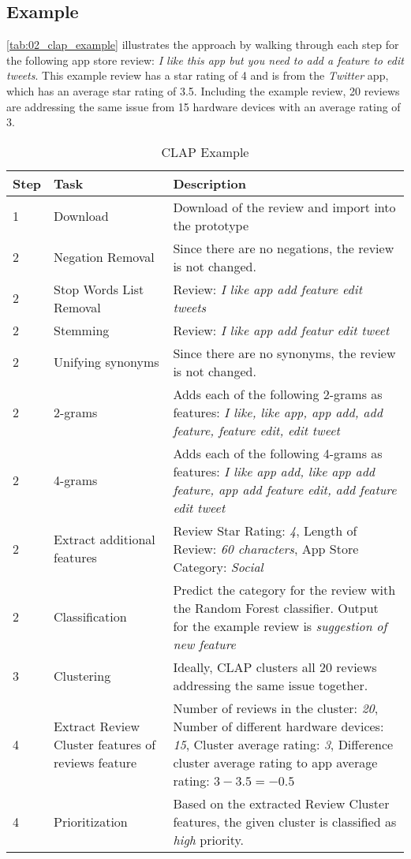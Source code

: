 \subsection{Example}

\autoref{tab:02_clap_example} illustrates the approach by walking through each step for the following app store review: \textit{I like this app but you need to add a feature to edit tweets}. This example review has a star rating of 4 and is from the \textit{Twitter} app, which has an average star rating of 3.5. Including the example review, 20 reviews are addressing the same issue from 15 hardware devices with an average rating of 3. 

\begin{table}
    \centering
    \caption{CLAP Example}
    \begin{tabular}{l|p{3cm}|p{9cm}} \hline
            Step  &  Task   &  Description \\ \hline\hline
        1     & Download & Download of the review and import into the prototype\\ \hline
        2     & Negation Removal & Since there are no negations, the review is not changed.  \\ \hline
        2     & Stop Words List Removal &  Review: \textit{I like app add feature edit tweets} \\ \hline
        2     & Stemming                &  Review:  \textit{I like app add featur edit tweet}  \\ \hline
        2     & Unifying synonyms       &  Since there are no synonyms, the review is not changed. \\ \hline
        2     & 2-grams & Adds each of the following 2-grams as features: \textit{I like, like app, app add, add feature, feature edit, edit tweet} \\ \hline
        2     & 4-grams & Adds each of the following 4-grams as features: \textit{I like app add, like app add feature, app add feature edit, add feature edit tweet}\\ \hline
        2     & Extract additional features & Review Star Rating: \textit{4}, Length of Review: \textit{60 characters}, App Store Category: \textit{Social} \\ \hline
        2     & Classification & Predict the category for the review with the Random Forest classifier. Output for the example review is \textit{suggestion of new feature}  \\ \hline
        3     & Clustering & Ideally, CLAP clusters all 20 reviews addressing the same issue together.  \\ \hline
        4     & Extract Review Cluster features of reviews feature & Number of reviews in the cluster: \textit{20}, Number of different hardware devices: \textit{15}, Cluster average rating: \textit{3}, Difference cluster average rating to app average rating: $3-3.5 = - 0.5$ \\ \hline
        4     & Prioritization & Based on the extracted Review Cluster features, the given cluster is classified as \textit{high} priority. \\ \hline
    \end{tabular}
    \label{tab:02_clap_example}
\end{table}

